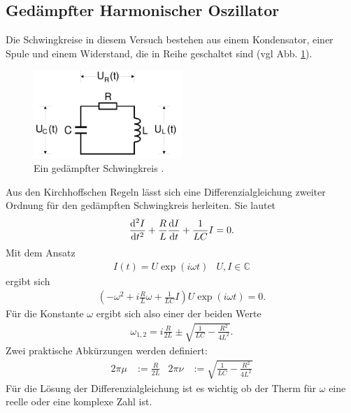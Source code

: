 \subsection{Gedämpfter Harmonischer Oszillator}
Die Schwingkreise in diesem Versuch bestehen aus einem Kondensator, einer Spule und einem Widerstand, 
die in Reihe geschaltet sind (vgl Abb. \ref{fig:ged_Schwingkreis_Schema}).
\begin{figure}
    \centering
    \includegraphics[width=0.5\textwidth]{Abbildungen/ged_Schwingkreis_Schema.png}
    \caption{Ein gedämpfter Schwingkreis \cite{man:v354}.}
    \label{fig:ged_Schwingkreis_Schema}
\end{figure}
Aus den Kirchhoffschen Regeln lässt sich eine Differenzialgleichung zweiter Ordnung für den gedämpften Schwingkreis herleiten.
Sie lautet
\begin{align}
    \frac{\mathop{}\!\mathrm{d}^2 I}{\mathop{}\!\mathrm{d} t^2}+ \frac{R}{L} \frac{\mathop{}\!\mathrm{d} I}{\mathop{}\!\mathrm{d} t} + \frac{1}{LC}I = 0 . 
    \label{eq:Hom_DGL}
\end{align}
Mit dem Ansatz
\begin{align*}
    I(t) = U \exp(i\omega t) & U, I \in \mathbb{C} 
\end{align*}
ergibt sich
\begin{align*}
    (- \omega^2 + i \frac{R}{L} \omega + \frac{1}{LC}I) U \exp(i\omega t)  = 0 .
\end{align*}
Für die Konstante $\omega$ ergibt sich also einer der beiden Werte
\begin{align*}
    \omega_{1,2} = i \frac{R}{2L} \pm \sqrt{\frac{1}{LC}-\frac{R^2}{4L^2}}.
\end{align*}
Zwei praktische Abkürzungen werden definiert:
\begin{align*}
    2\pi \mu &:= \frac{R}{2L} & 2 \pi \stackrel{~}{\nu} &:=  \sqrt{\frac{1}{LC}-\frac{R^2}{4L^2}}
\end{align*}
Für die Lösung der Differenzialgleichung ist es wichtig ob der Therm für $\omega$ eine reelle oder eine komplexe Zahl ist.

